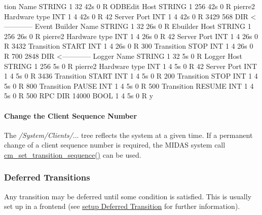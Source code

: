 \begin{DoxyCode}
      tion
        Name                    STRING  1     32    42s  0   R    ODBEdit
        Host                    STRING  1     256   42s  0   R    pierre2
        Hardware type           INT     1     4     42s  0   R    42
        Server Port             INT     1     4     42s  0   R    3429
    568                         DIR     <------------ Event Builder
        Name                    STRING  1     32    26s  0   R    Ebuilder
        Host                    STRING  1     256   26s  0   R    pierre2
        Hardware type           INT     1     4     26s  0   R    42
        Server Port             INT     1     4     26s  0   R    3432
        Transition START        INT     1     4     26s  0   R    300
        Transition STOP         INT     1     4     26s  0   R    700
    2848                        DIR     <------------ Logger 
        Name                    STRING  1     32    5s   0   R    Logger
        Host                    STRING  1     256   5s   0   R    pierre2
        Hardware type           INT     1     4     5s   0   R    42
        Server Port             INT     1     4     5s   0   R    3436
        Transition START        INT     1     4     5s   0   R    200
        Transition STOP         INT     1     4     5s   0   R    800
        Transition PAUSE        INT     1     4     5s   0   R    500
        Transition RESUME       INT     1     4     5s   0   R    500
        RPC                     DIR
            14000               BOOL    1     4     5s   0   R    y
\end{DoxyCode}


\par


\par
 \hypertarget{RC_Run_States_and_Transitions_RC_Change_Seq_Num}{}\paragraph{Change the Client Sequence Number}\label{RC_Run_States_and_Transitions_RC_Change_Seq_Num}
The {\itshape /System/Clients/\/}... tree reflects the system at a given time. If a permanent change of a client sequence number is required, the MIDAS system call \hyperlink{group__cmfunctionc_gac4b2b97d9cd12320b6f910f32e131aef}{cm\_\-set\_\-transition\_\-sequence()} can be used.

\par


\par
 \hypertarget{RC_Run_States_and_Transitions_RC_Deferred_Transition}{}\subsubsection{Deferred Transitions}\label{RC_Run_States_and_Transitions_RC_Deferred_Transition}
Any transition may be deferred until some condition is satisfied. This is usually set up in a frontend (see \hyperlink{FE_event_notification_FE_Deferred_Transition}{setup Deferred Transition} for further information).

